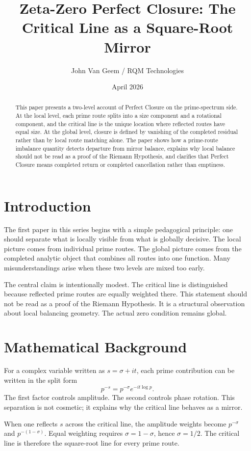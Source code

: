 \documentclass[11pt]{article}
\title{Zeta-Zero Perfect Closure: The Critical Line as a Square-Root Mirror}
\author{John Van Geem / RQM Technologies}
\date{April 2026}
\begin{document}
\maketitle

\begin{abstract}
This paper presents a two-level account of Perfect Closure on the prime-spectrum side. At the local level, each prime route splits into a size component and a rotational component, and the critical line is the unique location where reflected routes have equal size. At the global level, closure is defined by vanishing of the completed residual rather than by local route matching alone. The paper shows how a prime-route imbalance quantity detects departure from mirror balance, explains why local balance should not be read as a proof of the Riemann Hypothesis, and clarifies that Perfect Closure means completed return or completed cancellation rather than emptiness.
\end{abstract}

\section{Introduction}
The first paper in this series begins with a simple pedagogical principle: one should separate what is locally visible from what is globally decisive. The local picture comes from individual prime routes. The global picture comes from the completed analytic object that combines all routes into one function. Many misunderstandings arise when these two levels are mixed too early.

The central claim is intentionally modest. The critical line is distinguished because reflected prime routes are equally weighted there. This statement should not be read as a proof of the Riemann Hypothesis. It is a structural observation about local balancing geometry. The actual zero condition remains global.

\section{Mathematical Background}
For a complex variable written as $s=\sigma+it$, each prime contribution can be written in the split form
\[
p^{-s}=p^{-\sigma}e^{-it\log p}.
\]
The first factor controls amplitude. The second controls phase rotation. This separation is not cosmetic; it explains why the critical line behaves as a mirror.

When one reflects $s$ across the critical line, the amplitude weights become $p^{-\sigma}$ and $p^{-(1-\sigma)}$. Equal weighting requires $\sigma=1-\sigma$, hence $\sigma=1/2$. The critical line is therefore the square-root line for every prime route.
\end{document}
